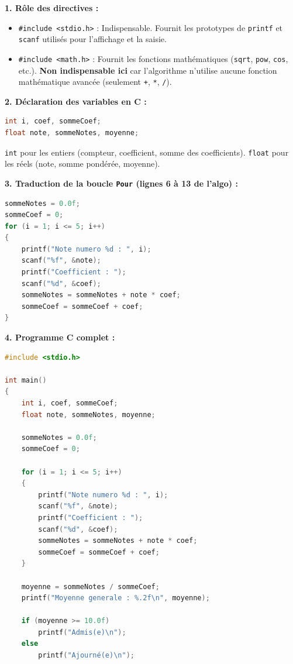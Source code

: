 \documentclass[11pt]{article}
\begin{document}
\begin{corrige}
\textbf{1. Rôle des directives :}
\begin{itemize}
  \item \texttt{\#include <stdio.h>} : Indispensable. Fournit les prototypes de \texttt{printf} et \texttt{scanf} utilisés pour l'affichage et la saisie.
  \item \texttt{\#include <math.h>} : Fournit les fonctions mathématiques (\texttt{sqrt}, \texttt{pow}, \texttt{cos}, etc.). \textbf{Non indispensable ici} car l'algorithme n'utilise aucune fonction mathématique avancée (seulement \texttt{+}, \texttt{*}, \texttt{/}).
\end{itemize}

\textbf{2. Déclaration des variables en C :}
\begin{lstlisting}[language=C]
int i, coef, sommeCoef;
float note, sommeNotes, moyenne;
\end{lstlisting}
\texttt{int} pour les entiers (compteur, coefficient, somme des coefficients). \texttt{float} pour les réels (note, somme pondérée, moyenne).

\textbf{3. Traduction de la boucle \texttt{Pour} (lignes 6 à 13 de l'algo) :}
\begin{lstlisting}[language=C]
sommeNotes = 0.0f;
sommeCoef = 0;
for (i = 1; i <= 5; i++)
{
    printf("Note numero %d : ", i);
    scanf("%f", &note);
    printf("Coefficient : ");
    scanf("%d", &coef);
    sommeNotes = sommeNotes + note * coef;
    sommeCoef = sommeCoef + coef;
}
\end{lstlisting}

\textbf{4. Programme C complet :}
\begin{lstlisting}[language=C]
#include <stdio.h>

int main()
{
    int i, coef, sommeCoef;
    float note, sommeNotes, moyenne;

    sommeNotes = 0.0f;
    sommeCoef = 0;

    for (i = 1; i <= 5; i++)
    {
        printf("Note numero %d : ", i);
        scanf("%f", &note);
        printf("Coefficient : ");
        scanf("%d", &coef);
        sommeNotes = sommeNotes + note * coef;
        sommeCoef = sommeCoef + coef;
    }

    moyenne = sommeNotes / sommeCoef;
    printf("Moyenne generale : %.2f\n", moyenne);

    if (moyenne >= 10.0f)
        printf("Admis(e)\n");
    else
        printf("Ajourné(e)\n");


\end{lstlisting}
\end{corrige}
\end{document}
